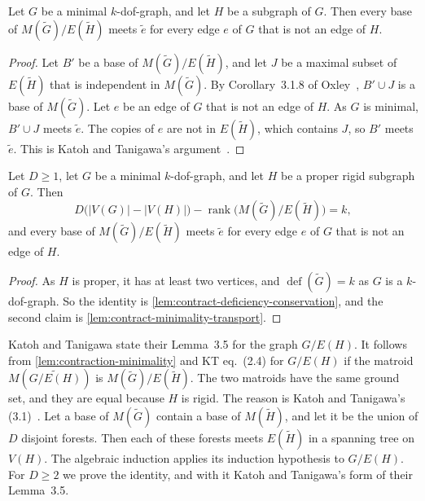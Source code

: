 \begin{lemma}
  \label{lem:contract-minimality-transport}
  \leanok
  Let $G$ be a minimal $k$-dof-graph, and let $H$ be a subgraph of $G$.
  Then every base of $M(\tilde G)/E(\tilde H)$ meets $\tilde e$ for every
  edge $e$ of $G$ that is not an edge of $H$.
\end{lemma}
\begin{proof}
  \leanok
  Let $B'$ be a base of $M(\tilde G)/E(\tilde H)$, and let $J$ be a
  maximal subset of $E(\tilde H)$ that is independent in $M(\tilde G)$.
  By Corollary~3.1.8 of Oxley~\cite{oxley2011}, $B' \cup J$ is a base of
  $M(\tilde G)$. Let $e$ be an edge of $G$ that is not an edge of $H$.
  As $G$ is minimal, $B' \cup J$ meets $\tilde e$. The copies of $e$ are
  not in $E(\tilde H)$, which contains $J$, so $B'$ meets $\tilde e$.
  This is Katoh and Tanigawa's argument~\cite[p.~659]{katohTanigawa2011}.
\end{proof}

\begin{lemma}
  \label{lem:contraction-minimality}
  \leanok
  Let $D \ge 1$, let $G$ be a minimal $k$-dof-graph, and let $H$ be a
  proper rigid subgraph of $G$. Then
  \[
    D\bigl(|V(G)| - |V(H)|\bigr) -
    \operatorname{rank}\bigl(M(\tilde G) / E(\tilde H)\bigr) = k,
  \]
  and every base of $M(\tilde G)/E(\tilde H)$ meets $\tilde e$ for every
  edge $e$ of $G$ that is not an edge of $H$.
\end{lemma}
\begin{proof}
  \leanok
  As $H$ is proper, it has at least two vertices, and
  $\operatorname{def}(\tilde G) = k$ as $G$ is a $k$-dof-graph. So the
  identity is \cref{lem:contract-deficiency-conservation}, and the
  second claim is \cref{lem:contract-minimality-transport}.
\end{proof}

Katoh and Tanigawa state their Lemma~3.5 for the graph $G/E(H)$. It
follows from \cref{lem:contraction-minimality} and KT eq.~(2.4) for
$G/E(H)$ if the matroid $M(\widetilde{G/E(H)})$ is
$M(\tilde G)/E(\tilde H)$. The two matroids have the same ground set,
and they are equal because $H$ is rigid. The reason is Katoh and
Tanigawa's (3.1)~\cite[p.~658]{katohTanigawa2011}. Let a base of
$M(\tilde G)$ contain a base of $M(\tilde H)$, and let it be the union
of $D$ disjoint forests. Then each of these forests meets $E(\tilde H)$
in a spanning tree on $V(H)$. The algebraic induction applies its
induction hypothesis to $G/E(H)$. For $D \ge 2$ we prove the identity,
and with it Katoh and Tanigawa's form of their Lemma~3.5.

